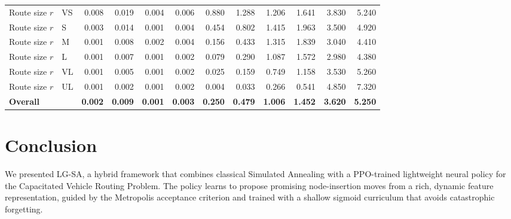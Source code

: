 \documentclass[letterpaper]{article} %
\begin{document}
\begin{table}[t]
\begin{tabular}{llrrrrrrrrrr}
Route size $r$ & VS & 0.008 & 0.019 & 0.004 & 0.006 & 0.880 & 1.288 & 1.206 & 1.641 & 3.830 & 5.240 \\
Route size $r$ & S & 0.003 & 0.014 & 0.001 & 0.004 & 0.454 & 0.802 & 1.415 & 1.963 & 3.500 & 4.920 \\
Route size $r$ & M & 0.001 & 0.008 & 0.002 & 0.004 & 0.156 & 0.433 & 1.315 & 1.839 & 3.040 & 4.410 \\
Route size $r$ & L & 0.001 & 0.007 & 0.001 & 0.002 & 0.079 & 0.290 & 1.087 & 1.572 & 2.980 & 4.380 \\
Route size $r$ & VL & 0.001 & 0.005 & 0.001 & 0.002 & 0.025 & 0.159 & 0.749 & 1.158 & 3.530 & 5.260 \\
Route size $r$ & UL & 0.001 & 0.002 & 0.001 & 0.002 & 0.004 & 0.033 & 0.266 & 0.541 & 4.850 & 7.320 \\
\midrule
\textbf{Overall} &  & \textbf{0.002} & \textbf{0.009} & \textbf{0.001} & \textbf{0.003} & \textbf{0.250} & \textbf{0.479} & \textbf{1.006} & \textbf{1.452} & \textbf{3.620} & \textbf{5.250} \\
\bottomrule
\end{tabular}

\end{table}

\section{Conclusion}
\label{sec:conclusion}

We presented LG-SA, a hybrid framework that combines classical Simulated Annealing with a PPO-trained lightweight neural policy for the Capacitated Vehicle Routing Problem. The policy learns to propose promising node-insertion moves from a rich, dynamic feature representation, guided by the Metropolis acceptance criterion and trained with a shallow sigmoid curriculum that avoids catastrophic forgetting.
\end{document}
